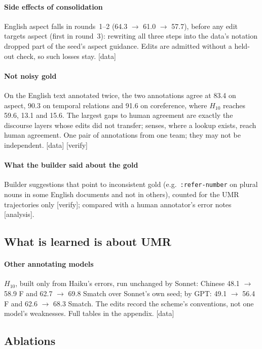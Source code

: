 \documentclass[11pt]{article}
\newcommand{\stag}[2]{\textcolor{#1}{\textsf{\scriptsize[#2]}}}
\newcommand{\HAVE}{\stag{green!50!black}{data}\xspace}
\newcommand{\ANA}{\stag{blue!70!black}{analysis}\xspace}
\newcommand{\CHK}{\stag{orange!80!black}{verify}\xspace}
\begin{document}
\paragraph{Side effects of consolidation}
English aspect falls in rounds~1--2 (64.3 $\rightarrow$ 61.0 $\rightarrow$ 57.7), before any edit targets aspect (first in round~3): rewriting all three steps into the data's notation dropped part of the seed's aspect guidance. Edits are admitted without a held-out check, so such losses stay. \HAVE

\paragraph{Not noisy gold}
On the English text annotated twice, the two annotations agree at 83.4 on aspect, 90.3 on temporal relations and 91.6 on coreference, where $H_{10}$ reaches 59.6, 13.1 and 15.6. The largest gaps to human agreement are exactly the discourse layers whose edits did not transfer; senses, where a lookup exists, reach human agreement. One pair of annotations from one team; they may not be independent. \HAVE{} \CHK

\paragraph{What the builder said about the gold}
Builder suggestions that point to inconsistent gold (e.g.\ \texttt{:refer-number} on plural nouns in some English documents and not in others), counted for the UMR trajectories only \CHK; compared with a human annotator's error notes \ANA.

\subsection{What is learned is about UMR}

\paragraph{Other annotating models}
$H_{10}$, built only from Haiku's errors, run unchanged by Sonnet: Chinese 48.1 $\rightarrow$ 58.9 F and 62.7 $\rightarrow$ 69.8 Smatch over Sonnet's own seed; by GPT: 49.1 $\rightarrow$ 56.4 F and 62.6 $\rightarrow$ 68.3 Smatch. The edits record the scheme's conventions, not one model's weaknesses. Full tables in the appendix. \HAVE

\subsection{Ablations}
\end{document}
